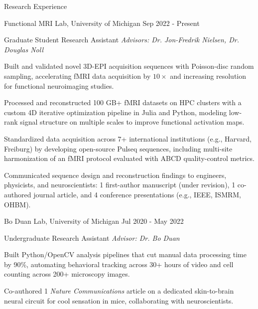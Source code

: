\documentclass{resume}
\begin{document}
\begin{rSection}{Research Experience}
    \begin{rSubsection}{Functional MRI Lab}{, University of Michigan \hfill {Sep 2022 - Present}}
    	\item {Graduate Student Research Assistant \hfill \textit{Advisors: Dr. Jon-Fredrik Nielsen, Dr. Douglas Noll}}
    	\begin{rSubsubsection}
            \item Built and validated novel 3D-EPI acquisition sequences with Poisson-disc random sampling, accelerating fMRI data acquisition by $10\times$ and increasing resolution for functional neuroimaging studies.
            \item Processed and reconstructed 100 GB+ fMRI datasets on HPC clusters with a custom 4D iterative optimization pipeline in Julia and Python, modeling low-rank signal structure on multiple scales to improve functional activation maps.
            \item Standardized data acquisition across 7+ international institutions (e.g., Harvard, Freiburg) by developing open-source Pulseq sequences, including multi-site harmonization of an fMRI protocol evaluated with ABCD quality-control metrics.
            \item Communicated sequence design and reconstruction findings to engineers, physicists, and neuroscientists: 1 first-author manuscript (under revision), 1 co-authored journal article, and 4 conference presentations (e.g., IEEE, ISMRM, OHBM).
    	\end{rSubsubsection}
	\end{rSubsection}

    \begin{rSubsection}{Bo Duan Lab}{, University of Michigan \hfill {Jul 2020 - May 2022}}
	\item {Undergraduate Research Assistant \hfill \textit{Advisor: Dr. Bo Duan}}
	\begin{rSubsubsection}
        \item Built Python/OpenCV analysis pipelines that cut manual data processing time by 90\%, automating behavioral tracking across 30+ hours of video and cell counting across 200+ microscopy images.
        \item Co-authored 1 \textit{Nature Communications} article on a dedicated skin-to-brain neural circuit for cool sensation in mice, collaborating with neuroscientists.
	\end{rSubsubsection}
    \end{rSubsection}
\end{rSection}
\end{document}
